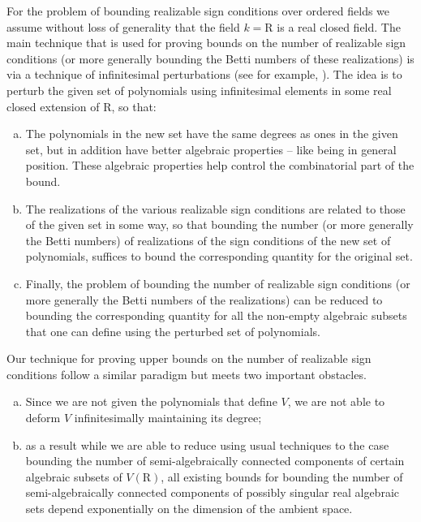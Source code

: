 \documentclass[10pt]{amsart}
\theoremstyle{definition}
\theoremstyle{remark}
\numberwithin{equation}{section}
\newcommand {\R} {\mathrm{R}}
\begin{document}
For the problem of bounding realizable sign conditions over ordered fields we
assume without loss of generality that the field  $k = \R$ is a real closed field. The main technique that is used for proving bounds on the number of realizable sign conditions (or more generally bounding the Betti numbers of these realizations) is via a technique of infinitesimal perturbations
(see for example, \cite{BPR02,BPRbook2}). The idea is to perturb the given set of polynomials using infinitesimal elements in some real closed extension of $\R$, so that:
\begin{enumerate}[(a)]
\item
The polynomials in the new set have the same degrees as ones in the given set, but in addition have better algebraic properties -- like being in general position. These algebraic properties help control the combinatorial part of the bound.
\item 
The realizations of the various realizable sign conditions are related to those of the given set in some way, so that bounding the number (or more generally the Betti numbers)  of 
realizations of the sign conditions of the new set of polynomials, suffices to bound the corresponding quantity for the original set. 
\item Finally, the problem of bounding the number of realizable sign conditions (or more generally the Betti numbers of the realizations) can be reduced to bounding the corresponding quantity for all the non-empty algebraic subsets that one can define using the perturbed set of polynomials.  
\end{enumerate}
Our technique for proving upper bounds on the number of realizable 
sign conditions follow a similar paradigm but meets two important obstacles.

\begin{enumerate}[(a)]
    \item Since we are not given the polynomials that define $V$, we are not able to deform $V$ infinitesimally maintaining its degree;
    \item as a result while we are able to reduce using usual techniques to the case bounding the number of semi-algebraically connected components of certain algebraic subsets of $V(\R)$, all existing bounds for bounding the number of semi-algebraically connected components of possibly singular real algebraic sets depend exponentially on the dimension of the ambient space.
\end{enumerate}
\end{document}
